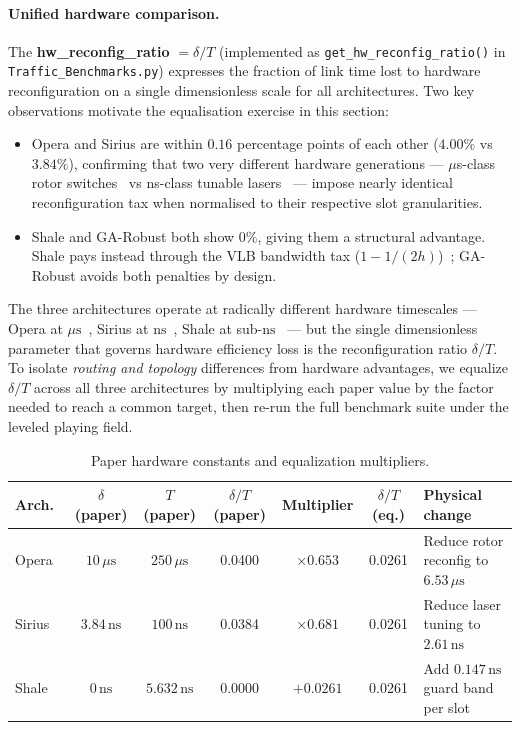 \documentclass{article}
\begin{document}
    \paragraph{Unified hardware comparison.}
    The \textbf{hw\_reconfig\_ratio} $= \delta/T$ (implemented as \texttt{get\_hw\_reconfig\_ratio()} in \texttt{Traffic\_Benchmarks.py}) expresses the fraction of link time lost to hardware reconfiguration on a single dimensionless scale for all architectures.  Two key observations motivate the equalisation exercise in this section:
    \begin{itemize}
        \item Opera and Sirius are within $0.16$ percentage points of each other ($4.00\%$ vs $3.84\%$), confirming that two very different hardware generations --- $\mu$s-class rotor switches~\cite{opera} vs ns-class tunable lasers~\cite{sirius} --- impose nearly identical reconfiguration tax when normalised to their respective slot granularities.
        \item Shale and GA-Robust both show $0\%$, giving them a structural advantage.  Shale pays instead through the VLB bandwidth tax ($1-1/(2h)$)~\cite{shale}; GA-Robust avoids both penalties by design.
    \end{itemize}

    The three architectures operate at radically different hardware timescales --- Opera at $\mu\text{s}$~\cite{opera}, Sirius at $\text{ns}$~\cite{sirius}, Shale at sub-$\text{ns}$~\cite{shale} --- but the single dimensionless parameter that governs hardware efficiency loss is the reconfiguration ratio $\delta/T$.  To isolate \emph{routing and topology} differences from hardware advantages, we equalize $\delta/T$ across all three architectures by multiplying each paper value by the factor needed to reach a common target, then re-run the full benchmark suite under the leveled playing field.

    \begin{table}[H]
        \centering
        \caption{Paper hardware constants and equalization multipliers.}
        \begin{tabular}{|l|c|c|c|c|c|l|}
            \hline
            \textbf{Arch.} & $\delta$ (paper) & $T$ (paper) & $\delta/T$ (paper) & \textbf{Multiplier} & $\delta/T$ (eq.) & \textbf{Physical change} \\
            \hline
            Opera~\cite{opera}
                & $10\,\mu\text{s}$ & $250\,\mu\text{s}$ & 0.0400 & $\times 0.653$ & 0.0261
                & Reduce rotor reconfig to $6.53\,\mu\text{s}$ \\
            Sirius~\cite{sirius}
                & $3.84\,\text{ns}$ & $100\,\text{ns}$ & 0.0384 & $\times 0.681$ & 0.0261
                & Reduce laser tuning to $2.61\,\text{ns}$ \\
            Shale~\cite{shale}
                & $0\,\text{ns}$ & $5.632\,\text{ns}$ & 0.0000 & $+0.0261$ & 0.0261
                & Add $0.147\,\text{ns}$ guard band per slot \\
            \hline
        \end{tabular}
        \label{tab:hw_equalization}
    \end{table}
\end{document}
